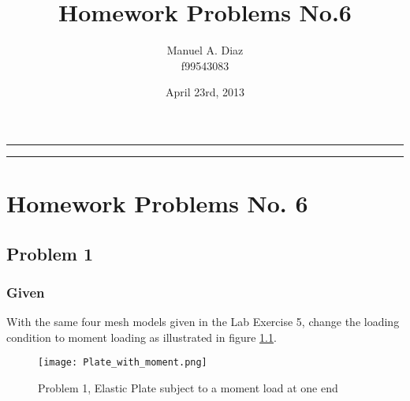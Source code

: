 \documentclass[a4paper]{memoir}
\title{\huge \textbf{Homework Problems No.6}}
\author{Manuel A. Diaz \\ f99543083}
\date{April 23rd, 2013} %
\begin{document}
\thispagestyle{empty}
\begin{center}{
\begin{shaded}
\hrule \vspace{30pt}
\hspace{30pt} \thetitle  \vspace{30pt}
\newline \theauthor \hspace{30pt} \thedate  \vspace{26pt}
\hrule
\end{shaded}
}
\end{center}
\clearpage


\pagestyle{Ruled}                    %
\midsloppy                             %


\checkandfixthelayout          %

\chapter{Homework Problems No. 6}
\section{Problem 1}
\subsection{Given}
With the same four mesh models given in the Lab Exercise 5, change the loading condition to moment loading as illustrated in figure \ref{fig:loaded_plate}.

\begin{figure}
	\centering
		\texttt{[image: Plate\_with\_moment.png]}
	\caption{Problem 1, Elastic Plate subject to a moment load at one end}
	\label{fig:loaded_plate}
\end{figure}
\end{document}
